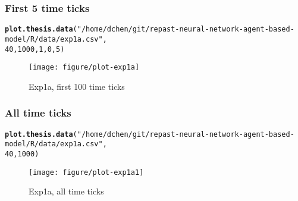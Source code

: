 \documentclass{article}\usepackage[]{graphicx}\usepackage[]{color}
\makeatletter
\def\maxwidth{ %
  \ifdim\Gin@nat@width>\linewidth
    \linewidth
  \else
    \Gin@nat@width
  \fi
}
\newcommand{\hlnum}[1]{\textcolor[rgb]{0.686,0.059,0.569}{#1}}%
\newcommand{\hlstr}[1]{\textcolor[rgb]{0.192,0.494,0.8}{#1}}%
\newcommand{\hlstd}[1]{\textcolor[rgb]{0.345,0.345,0.345}{#1}}%
\newcommand{\hlkwd}[1]{\textcolor[rgb]{0.737,0.353,0.396}{\textbf{#1}}}%
\newenvironment{kframe}{%
 \def\at@end@of@kframe{}%
 \ifinner\ifhmode%
  \def\at@end@of@kframe{\end{minipage}}%
  \begin{minipage}{\columnwidth}%
 \fi\fi%
 \def\FrameCommand##1{\hskip\@totalleftmargin \hskip-\fboxsep
 \colorbox{shadecolor}{##1}\hskip-\fboxsep
     \hskip-\linewidth \hskip-\@totalleftmargin \hskip\columnwidth}%
 \MakeFramed {\advance\hsize-\width
   \@totalleftmargin\z@ \linewidth\hsize
   \@setminipage}}%
 {\par\unskip\endMakeFramed%
 \at@end@of@kframe}
\newenvironment{knitrout}{}{} %
\makeatother
\begin{document}
\subsubsection{First 5 time ticks}
\begin{knitrout}
\color{fgcolor}\begin{kframe}
\begin{alltt}
\hlkwd{plot.thesis.data}\hlstd{(}\hlstr{"/home/dchen/git/repast-neural-network-agent-based-model/R/data/exp1a.csv"}\hlstd{,}
    \hlnum{40}\hlstd{,} \hlnum{1000}\hlstd{,} \hlnum{1}\hlstd{,} \hlnum{0}\hlstd{,} \hlnum{5}\hlstd{)}
\end{alltt}
\end{kframe}\begin{figure}[]

\texttt{[image: figure/plot-exp1a]} \caption[Exp1a, first 100 time ticks]{Exp1a, first 100 time ticks\label{fig:plot-exp1a}}
\end{figure}


\end{knitrout}


\newpage
\subsubsection{All time ticks}
\begin{knitrout}
\color{fgcolor}\begin{kframe}
\begin{alltt}
\hlkwd{plot.thesis.data}\hlstd{(}\hlstr{"/home/dchen/git/repast-neural-network-agent-based-model/R/data/exp1a.csv"}\hlstd{,}
    \hlnum{40}\hlstd{,} \hlnum{1000}\hlstd{)}
\end{alltt}
\end{kframe}\begin{figure}[]

\texttt{[image: figure/plot-exp1a1]} \caption[Exp1a, all time ticks]{Exp1a, all time ticks\label{fig:plot-exp1a1}}
\end{figure}


\end{knitrout}
\end{document}
